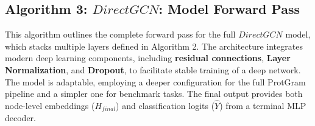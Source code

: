 \documentclass[utf8]{frontiers_suppmat}
\begin{document}
\subsection*{Algorithm 3: \textit{$DirectGCN$}: Model Forward Pass}
This algorithm outlines the complete forward pass for the full \textbf{$DirectGCN$} model, which stacks multiple layers defined in Algorithm 2. The architecture integrates modern deep learning components, including \textbf{residual connections}, \textbf{Layer Normalization}, and \textbf{Dropout}, to facilitate stable training of a deep network. The model is adaptable, employing a deeper configuration for the full ProtGram pipeline and a simpler one for benchmark tasks. The final output provides both node-level embeddings ($H_{final}$) and classification logits ($\hat{Y}$) from a terminal MLP decoder.
\end{document}

